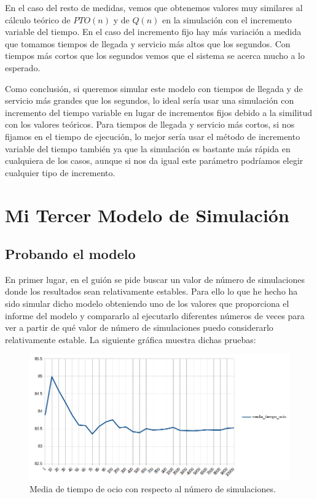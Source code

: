 \documentclass[11pt,a4paper]{report}
\begin{document}
En el caso del resto de medidas, vemos que obtenemos valores muy similares al cálculo teórico de $PTO(n)$ y de $Q(n)$ en la simulación con el incremento variable del tiempo. En el caso del incremento fijo hay más variación a medida que tomamos tiempos de llegada y servicio más altos que los segundos. Con tiempos más cortos que los segundos vemos que el sistema se acerca mucho a lo esperado.

Como conclusión, si queremos simular este modelo con tiempos de llegada y de servicio más grandes que los segundos, lo ideal sería usar una simulación con incremento del tiempo variable en lugar de incrementos fijos debido a la similitud con los valores teóricos. Para tiempos de llegada y servicio más cortos, si nos fijamos en el tiempo de ejecución, lo mejor sería usar el método de incremento variable del tiempo también ya que la simulación es bastante más rápida en cualquiera de los casos, aunque si nos da igual este parámetro podríamos elegir cualquier tipo de incremento.

\newpage

\chapter{Mi Tercer Modelo de Simulación}
\newpage

\section{Probando el modelo}

En primer lugar, en el guión se pide buscar un valor de número de simulaciones donde los resultados sean relativamente estables. Para ello lo que he hecho ha sido simular dicho modelo obteniendo uno de los valores que proporciona el informe del modelo y compararlo al ejecutarlo diferentes números de veces para ver a partir de qué valor de número de simulaciones puedo considerarlo relativamente estable. La siguiente gráfica muestra dichas pruebas:

\begin{figure}[H]
    \includegraphics[width=\textwidth]{img/cap-2/valores_estables.png}
  	\caption{Media de tiempo de ocio con respecto al número de simulaciones.}
\end{figure}
\end{document}
